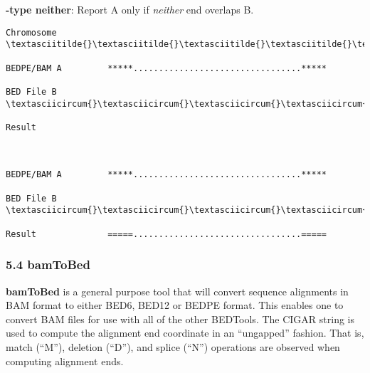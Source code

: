 \documentclass[letterpaper,10pt,english]{sphinxmanual}
\begin{document}
\textbf{-type neither}: Report A only if \emph{neither} end overlaps B.

\begin{Verbatim}[commandchars=\\\{\}]
Chromosome  \textasciitilde{}\textasciitilde{}\textasciitilde{}\textasciitilde{}\textasciitilde{}\textasciitilde{}\textasciitilde{}\textasciitilde{}\textasciitilde{}\textasciitilde{}\textasciitilde{}\textasciitilde{}\textasciitilde{}\textasciitilde{}\textasciitilde{}\textasciitilde{}\textasciitilde{}\textasciitilde{}\textasciitilde{}\textasciitilde{}\textasciitilde{}\textasciitilde{}\textasciitilde{}\textasciitilde{}\textasciitilde{}\textasciitilde{}\textasciitilde{}\textasciitilde{}\textasciitilde{}\textasciitilde{}\textasciitilde{}\textasciitilde{}\textasciitilde{}\textasciitilde{}\textasciitilde{}\textasciitilde{}\textasciitilde{}\textasciitilde{}\textasciitilde{}\textasciitilde{}\textasciitilde{}\textasciitilde{}\textasciitilde{}\textasciitilde{}\textasciitilde{}\textasciitilde{}\textasciitilde{}\textasciitilde{}\textasciitilde{}\textasciitilde{}\textasciitilde{}\textasciitilde{}\textasciitilde{}\textasciitilde{}\textasciitilde{}\textasciitilde{}\textasciitilde{}\textasciitilde{}\textasciitilde{}\textasciitilde{}\textasciitilde{}\textasciitilde{}\textasciitilde{}\textasciitilde{}

BEDPE/BAM A         *****.................................*****

BED File B         \textasciicircum{}\textasciicircum{}\textasciicircum{}\textasciicircum{}\textasciicircum{}\textasciicircum{}\textasciicircum{}\textasciicircum{}......................................\textasciicircum{}\textasciicircum{}\textasciicircum{}\textasciicircum{}\textasciicircum{}\textasciicircum{}

Result



BEDPE/BAM A         *****.................................*****

BED File B    \textasciicircum{}\textasciicircum{}\textasciicircum{}\textasciicircum{}................................................\textasciicircum{}\textasciicircum{}\textasciicircum{}\textasciicircum{}\textasciicircum{}\textasciicircum{}

Result              =====.................................=====
\end{Verbatim}


\subsubsection{5.4 bamToBed}
\label{content/bamToBed:bamtobed}\label{content/bamToBed::doc}
\textbf{bamToBed} is a general purpose tool that will convert sequence alignments in BAM format to either
BED6, BED12 or BEDPE format. This enables one to convert BAM files for use with all of the other
BEDTools. The CIGAR string is used to compute the alignment end coordinate in an ``ungapped''
fashion. That is, match (``M''), deletion (``D''), and splice (``N'') operations are observed when computing
alignment ends.
\end{document}
